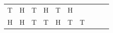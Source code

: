 {\begin{tabular}[t]{|l|l|l|l|l|l|l|l|l|l|}
        T &
        H &
        T &
        H &
        T &
        H%
     \tabularnewline\cline{1-1}\cline{2-2}\cline{3-3}\cline{4-4}\cline{5-5}\cline{6-6}\cline{7-7}\cline{8-8}\cline{9-9}\cline{10-10}
        H &
        H &
        T &
        T &
        H &
        T &
        T &

\end{tabular}}
